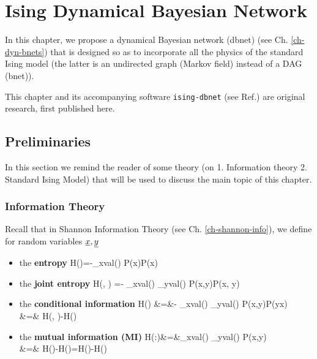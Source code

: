 \chapter{Ising Dynamical Bayesian Network}
\label{ch-ising-dbnet}

In this chapter, we propose a dynamical Bayesian network (dbnet) (see Ch. \ref{ch-dyn-bnets})
that is designed so as to incorporate
all the physics of the 
standard Ising model (the latter is 
an undirected graph (Markov field)
instead of a DAG (bnet)).

This chapter and its accompanying software 
{\tt ising-dbnet} (see Ref.\cite{isingdbnet}) are original research, first published here.

\section{Preliminaries}
In this section 
we remind the reader 
of some theory 
(on 1. Information theory 2. Standard Ising Model) 
that will be used to discuss
the main topic of this chapter.


\subsection{Information Theory}

Recall that in Shannon Information Theory (see Ch. \ref{ch-shannon-info}), we define
for random variables $\rvx, \rvy$
\begin{itemize}

\item the {\bf entropy}
\beq
H(\rvx)=-\sum_{x\in val(\rvx)} P(x)\ln P(x)
\eeq

\item the {\bf joint entropy}
\beq
H(\rvx, \rvy) =-
\sum_{x\in val(\rvx)}
\sum_{y\in val(\rvy)}
P(x,y)\ln P(x, y)
\eeq

\item the {\bf conditional information}
\beqa
H(\rvy\mid \rvx) &=&-
\sum_{x\in val(\rvx)}
\sum_{y\in val(\rvy)}
P(x,y)\ln P(y\mid x)
\\
&=&
H(\rvx, \rvy)-H(\rvx)
\eeqa

\item the {\bf mutual information (MI)}
\beqa
H(\rvx:\rvy)&=&\sum_{x\in val(\rvx)}
\sum_{y\in val(\rvy)}
P(x,y)\ln {}
\\
&=& H(\rvy)-H(\rvy\mid\rvx)=H(\rvx)-H(\rvx\mid\rvy)
\eeqa
\end{itemize}

